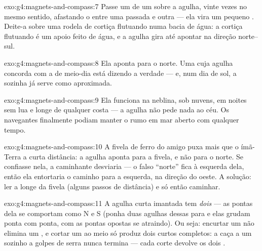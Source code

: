 \begin{solution}{exo:g4:magnets-and-compass:7}
Passe um  de um  sobre a agulha, vinte vezes no mesmo sentido,
afastando o  entre uma passada e outra --- ela vira um pequeno
. Deite-a sobre uma rodela de cortiça flutuando numa bacia de
água: a cortiça flutuando é um apoio feito de água, e a agulha gira
até apontar na direção norte--sul.
\end{solution}

\begin{solution}{exo:g4:magnets-and-compass:8}
Ela aponta para o norte. Uma  cuja agulha concorda com a
 de meio-dia está dizendo a verdade --- e, num dia de sol, a
 sozinha já serve como  aproximada.
\end{solution}

\begin{solution}{exo:g4:magnets-and-compass:9}
Ela funciona na neblina, sob nuvens, em noites sem lua e longe de
qualquer costa --- a agulha não pede nada ao céu. Os navegantes
finalmente podiam manter o rumo em mar aberto com qualquer tempo.
\end{solution}

\begin{solution}{exo:g4:magnets-and-compass:10}
A fivela de ferro do amigo puxa mais que o ímã-Terra a curta
distância: a agulha aponta para a fivela, e não para o norte. Se
confiasse nela, a caminhante desviaria --- o falso ``norte'' fica à
esquerda dela, então ela entortaria o caminho para a esquerda, na
direção do oeste. A solução: ler a  longe da fivela (alguns
passos de distância) e só então caminhar.
\end{solution}

\begin{solution}{exo:g4:magnets-and-compass:11}
A agulha curta imantada tem \emph{dois}  --- as pontas dela se
comportam como N e S (ponha duas agulhas dessas para  e elas
grudam ponta com ponta, com as pontas opostas se atraindo). Ou seja:
encurtar um  não elimina um , e cortar um  ao meio só
produz dois  curtos completos: a caça a um  sozinho a golpes
de serra nunca termina --- cada corte devolve os dois .
\end{solution}

